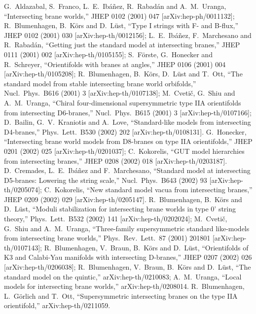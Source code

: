 \documentclass[a4paper,12pt]{article}
\def\bb#1{\hbox{\mbm #1}}
\begin{document}
\begin{thebibliography}{77}
G.~Aldazabal, S.~Franco, L.~E.~Ib\'a\~{n}ez, R.~Rabad\'an and A.~M.~Uranga,
``Intersecting brane worlds,''
JHEP 0102 (2001) 047
[arXiv:hep-ph/0011132];
R.~Blumenhagen, B.~K\"ors and D.~L\"ust,
``Type I strings with F- and B-flux,''
JHEP 0102 (2001) 030
[arXiv:hep-th/0012156];
L.~E.~Ib\'a\~nez, F.~Marchesano and R.~Rabad\'an,
``Getting just the standard model at intersecting branes,''
JHEP 0111 (2001) 002
[arXiv:hep-th/0105155];
S.~F\"orste, G.~Honecker and R.~Schreyer,
``Orientifolds with branes at angles,''
JHEP 0106 (2001) 004
[arXiv:hep-th/0105208];
R.~Blumenhagen, B.~K\"ors, D.~L\"ust and T.~Ott,
``The standard model from stable intersecting brane world orbifolds,''
Nucl.\ Phys.\ B616 (2001) 3
[arXiv:hep-th/0107138];
M.~Cveti\v{c}, G.~Shiu and A.~M.~Uranga,
``Chiral four-dimensional \coordHE{} supersymmetric type 
IIA orientifolds from  intersecting D6-branes,''
Nucl.\ Phys.\ B615 (2001) 3
[arXiv:hep-th/0107166];
D.~Bailin, G.~V.~Kraniotis and A.~Love,
``Standard-like models from intersecting D4-branes,''
Phys.\ Lett.\ B530 (2002) 202
[arXiv:hep-th/0108131].
G.~Honecker,
``Intersecting brane world models from D8-branes on  
\myHighlight{$(T^2 \times T^2/\bb{Z}_3)/Omega R_1$}\coordHE{} type IIA orientifolds,''
JHEP 0201 (2002) 025
[arXiv:hep-th/0201037];
C.~Kokorelis,
``GUT model hierarchies from intersecting branes,''
JHEP 0208 (2002) 018
[arXiv:hep-th/0203187].
D.~Cremades, L.~E.~Ib\'a\~nez and F.~Marchesano,
``Standard model at intersecting D5-branes: Lowering the string scale,''
Nucl.\ Phys.\ B643 (2002) 93
[arXiv:hep-th/0205074];
C.~Kokorelis,
``New standard model vacua from intersecting branes,''
JHEP 0209 (2002) 029
[arXiv:hep-th/0205147].
R.~Blumenhagen, B.~K\"ors and D.~L\"ust,
``Moduli stabilization for intersecting brane worlds 
in type 0' string  theory,''
Phys.\ Lett.\ B532 (2002) 141
[arXiv:hep-th/0202024];
M.~Cveti\v{c}, G.~Shiu and A.~M.~Uranga,
``Three-family supersymmetric standard like-models 
from intersecting  brane worlds,''
Phys.\ Rev.\ Lett.\  87 (2001) 201801
[arXiv:hep-th/0107143];
R.~Blumenhagen, V.~Braun, B.~K\"ors and D.~L\"ust,
``Orientifolds of K3 and Calabi-Yau manifolds with intersecting D-branes,''
JHEP 0207 (2002) 026
[arXiv:hep-th/0206038];
R.~Blumenhagen, V.~Braun, B.~K\"ors and D.~L\"ust,
``The standard model on the quintic,''
arXiv:hep-th/0210083;
A.~M.~Uranga,
``Local models for intersecting brane worlds,''
arXiv:hep-th/0208014.
R.~Blumenhagen, L.~G\"orlich and T.~Ott,
``Supersymmetric intersecting branes on the type IIA \myHighlight{$T^6/\bb{Z}_4$}\coordHE{}  
orientifold,''
arXiv:hep-th/0211059.



\end{thebibliography}
\end{document}
